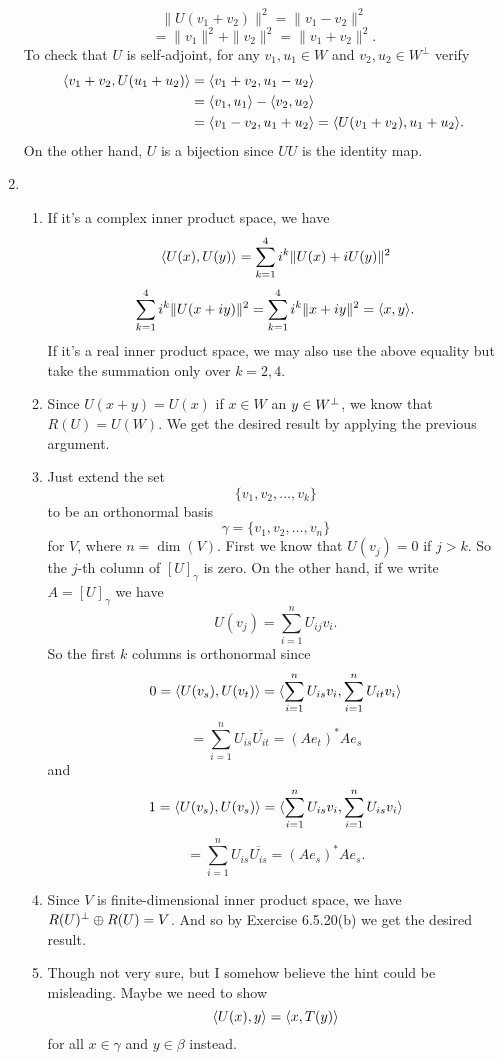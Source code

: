 \begin{enumerate}
\[\|U(v_1+v_2)\|^2=\|v_1-v_2\|^2\]
\[=\|v_1\|^2+\|v_2\|^2=\|v_1+v_2\|^2.\]
To check that $U$ is self-adjoint, for any $v_1,u_1\in W$ and $v_2,u_2\in W^\perp$ verify  
\[\begin{aligned}
    \langle v_1 + v_2, U(u_1 + u_2)\rangle &= \langle v_1 + v_2, u_1 - u_2\rangle \\
     &= \langle v_1, u_1\rangle - \langle v_2, u_2\rangle \\
     &= \langle v_1 - v_2, u_1 + u_2\rangle = \langle U(v_1 + v_2), u_1 + u_2\rangle. \\
\end{aligned}\]
On the other hand, $U$ is a bijection since $UU$ is the identity map.
\item \begin{enumerate}
\item If it's a complex inner product space, we have 
\[\langle U(x),U(y)\rangle =\sum_{k=1}^4{i^k\|U(x)+iU(y)\|^2}\]
\[\sum_{k=1}^4{i^k\|U(x+iy)\|^2}=\sum_{k=1}^4{i^k\|x+iy\|^2}=\langle x,y\rangle.\]
If it's a real inner product space, we may also use the above equality but take the summation only over $k=2,4$.
\item Since $U(x+y)=U(x)$ if $x\in W$ an $y\in W^{\perp}$, we know that $R(U)=U(W)$. We get the desired result by applying the previous argument.
\item Just extend the set 
\[\{v_1,v_2,\ldots ,v_k\}\] to be an orthonormal basis 
\[\gamma =\{v_1,v_2,\ldots ,v_n\}\]
for $V$, where $n=\dim(V)$. First we know that $U(v_j)=0$ if $j>k$. So the $j$-th column of $[U]_{\gamma}$ is zero. On the other hand, if we write $A=[U]_{\gamma}$ we have 
\[U(v_j)=\sum_{i=1}^n{U_{ij}v_i}.\]
So the first $k$ columns is orthonormal since 
\[0=\langle U(v_s),U(v_t)\rangle =\langle \sum_{i=1}^n{U_{is}v_i},\sum_{i=1}^n{U_{it}v_i}\rangle \]
\[=\sum_{i=1}^n{U_{is}\overline{U_{it}}}= (Ae_t)^*Ae_s \]
and 
\[1=\langle U(v_s),U(v_s)\rangle =\langle \sum_{i=1}^n{U_{is}v_i},\sum_{i=1}^n{U_{is}v_i}\rangle \]
\[=\sum_{i=1}^n{U_{is}\overline{U_{is}}}= (Ae_s)^*Ae_s .\]
\item Since $V$ is finite-dimensional inner product space, we have $R(U)^{\perp}\oplus R(U)=V$. And so by Exercise 6.5.20(b) we get the desired result.
\item Though not very sure, but I somehow believe the hint could be misleading.  Maybe we need to show  
\[
    \langle U(x), y\rangle = \langle x, T(y)\rangle
\]
for all $x\in\gamma$ and $y\in\beta$ instead.  


\end{enumerate}
\end{enumerate}
